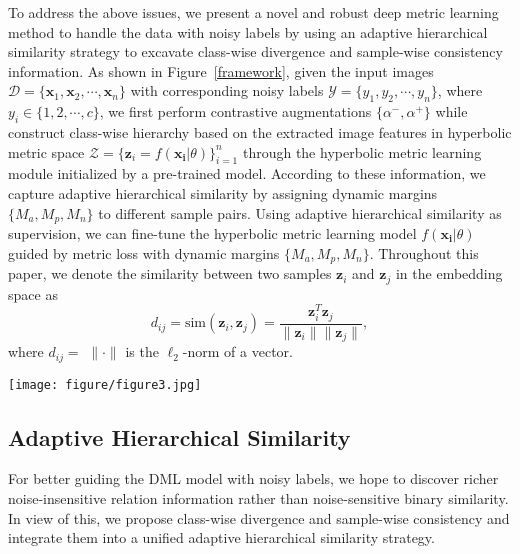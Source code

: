 \documentclass[lettersize,journal]{IEEEtran}
\begin{document}
To address the above issues, we present a novel and robust deep metric learning method to handle the data with noisy labels by using an adaptive hierarchical similarity strategy to excavate class-wise divergence and sample-wise consistency information. As shown in Figure~\ref{framework}, given the input images  $\mathcal{D} = \lbrace \mathbf{x}_1, \mathbf{x}_2, \cdots,  \mathbf{x}_n \rbrace$  with corresponding noisy labels $\mathcal{Y} = \lbrace y_1, y_2, \cdots, y_n \rbrace$, where $y_i \in \lbrace 1,2, \cdots, c \rbrace$,  we first perform contrastive augmentations $\lbrace \alpha^{-}, \alpha^{+} \rbrace$ while construct class-wise hierarchy based on the
extracted image features in hyperbolic metric space $\mathcal{Z} = \lbrace \mathbf{z}_i = f(\mathbf{x_i}| \theta) \rbrace_{i=1}^n$  through the hyperbolic metric learning module initialized by a pre-trained model. According to these information, we capture adaptive  hierarchical similarity by assigning dynamic margins $\lbrace M_a, M_p, M_n \rbrace$ to different sample pairs. Using adaptive hierarchical similarity as supervision, we can fine-tune the hyperbolic metric learning model $ f(\mathbf{x_i}| \theta)$ guided by metric loss with dynamic margins $\lbrace M_a, M_p, M_n \rbrace$. Throughout this paper, we denote the similarity between two samples $\mathbf{z}_i$ and $\mathbf{z}_j$ in the embedding space as 
\begin{equation}
	d_{ij} = \text{sim}(\mathbf{z}_i,\mathbf{z}_j) = \frac{\mathbf{z}_i^T\mathbf{z}_j}{\lVert\mathbf{z}_i\rVert\lVert\mathbf{z}_j\rVert},
\end{equation}
where $d_{ij} = $ $\lVert\cdot\rVert$ is the $\ell_2$-norm of a vector.


\begin{figure*}[t]
	\centering
	\texttt{[image: figure/figure3.jpg]}
	\caption{The pipeline of our proposed Adaptive Hierarchical Similarity Metric Learning. The model can be divided into three parts, \textit{i.e.}, class-wise hierarchy construction, contrastive augmentation, and adaptive hierarchical similarity integration. The class-wise hierarchy is calculated by intra(inter)-similarity. Combined with class-wise divergence and sample-wise consistency, the adaptive hierarchical similarity can be derived through dynamic margins $\lbrace M_a, M_p, M_n \rbrace$.}
	\label{framework}
\end{figure*}


\subsection{Adaptive Hierarchical Similarity}
\label{Adaptive}
For better guiding the DML model with noisy labels,
we hope to discover richer noise-insensitive relation information rather
than noise-sensitive binary similarity. In view of this, we propose class-wise divergence and sample-wise consistency and integrate them into a unified adaptive hierarchical similarity strategy.
\end{document}
